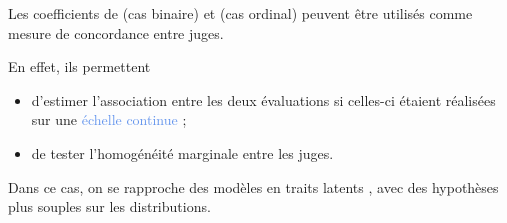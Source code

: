 
Les coefficients de  (cas binaire) et
 (cas ordinal) peuvent être utilisés comme mesure de
concordance entre juges.

En effet, ils permettent
\begin{itemize}
\item d'estimer l'association entre les deux évaluations si celles-ci étaient
  réalisées sur une \textcolor{CornflowerBlue}{échelle continue} ;
\item de tester l'homogénéité marginale entre les juges.
\end{itemize}
\medskip

Dans ce cas, on se rapproche des modèles en traits latents \autocite{uebersaxA},
avec des hypothèses plus souples sur les distributions.


